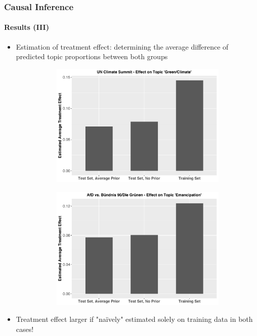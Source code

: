 \documentclass[xcolor=dvipsnames]{beamer}
\begin{document}
\begin{frame}
\frametitle{Causal Inference}
\framesubtitle{Results (III)}
\begin{itemize}
\item Estimation of treatment effect: determining the average difference of predicted topic proportions between both groups
\begin{figure}[h!]
  \centering
  \captionsetup{justification=centering,margin=2cm}
  \begin{subfigure}[b]{0.4\linewidth}
    \includegraphics[width=\linewidth]{../plots/presentation/climate_summit_ate.pdf}
  \end{subfigure}
  \begin{subfigure}[b]{0.4\linewidth}
    \includegraphics[width=\linewidth]{../plots/presentation/emancipation_ate.pdf}
  \end{subfigure}
\end{figure}
\item Treatment effect larger if "na{\"i}vely" estimated solely on training data in both cases!
\end{itemize}
\end{frame}
\end{document}
